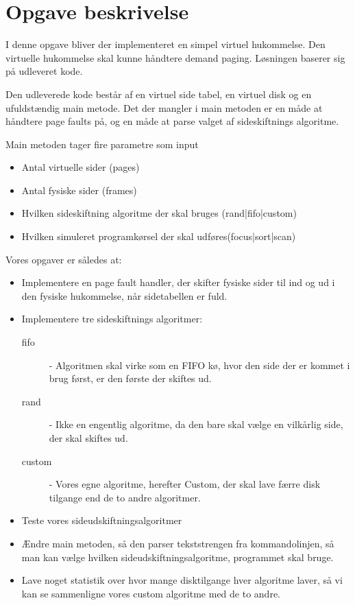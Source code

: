 \section{Opgave beskrivelse}

I denne opgave bliver der implementeret en simpel virtuel hukommelse. Den virtuelle hukommelse skal kunne håndtere demand paging. Løsningen baserer sig på udleveret kode.

Den udleverede kode består af en virtuel side tabel, en virtuel disk og en ufuldstændig main metode. Det der mangler i main metoden er en måde at håndtere page faults på, og en måde at parse valget af sideskiftnings algoritme.

Main metoden tager fire parametre som input

\begin{itemize}
\item Antal virtuelle sider (pages)
\item Antal fysiske sider (frames)
\item Hvilken sideskiftning algoritme der skal bruges (rand|fifo|custom)
\item Hvilken simuleret programkørsel der skal udføres(focus|sort|scan)
\end{itemize} 

Vores opgaver er således at:

\begin{itemize}
\item Implementere en page fault handler, der skifter fysiske sider til ind og ud i den fysiske hukommelse, når sidetabellen er fuld.

\item Implementere tre sideskiftnings algoritmer: 

\begin{description}
\item[fifo] - Algoritmen skal virke som en FIFO kø, hvor den side der er kommet i brug først, er den første der skiftes ud. 
\item[rand] - Ikke en engentlig algoritme, da den bare skal vælge en vilkårlig side, der skal skiftes ud.
\item[custom] - Vores egne algoritme, herefter Custom, der skal lave færre disk tilgange end de to andre algoritmer. 
\end{description}

\item Teste vores sideudskiftningsalgoritmer

\item Ændre main metoden, så den parser tekststrengen fra kommandolinjen, så man kan vælge hvilken sideudskiftningsalgoritme, programmet skal bruge.

\item Lave noget statistik over hvor mange disktilgange hver algoritme laver, så vi kan se sammenligne vores custom algoritme med de to andre.
\end{itemize}